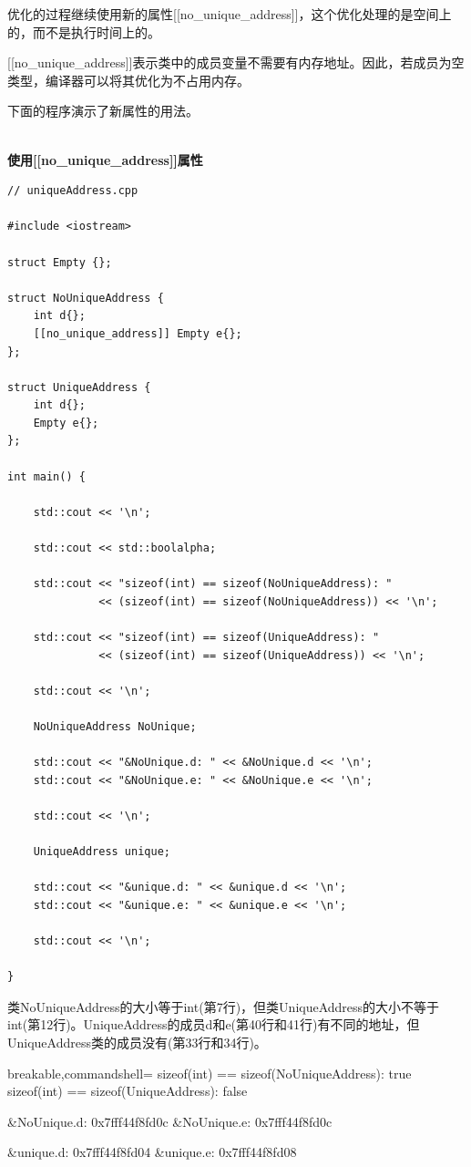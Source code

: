 优化的过程继续使用新的属性[[no\_unique\_address]]，这个优化处理的是空间上的，而不是执行时间上的。


[[no\_unique\_address]]表示类中的成员变量不需要有内存地址。因此，若成员为空类型，编译器可以将其优化为不占用内存。

下面的程序演示了新属性的用法。

\hspace*{\fill} \\ %
\noindent
\textbf{使用[[no\_unique\_address]]属性}
\begin{lstlisting}[style=styleCXX]
// uniqueAddress.cpp

#include <iostream>

struct Empty {};

struct NoUniqueAddress {
	int d{};
	[[no_unique_address]] Empty e{};
};

struct UniqueAddress {
	int d{};
	Empty e{};
};

int main() {

	std::cout << '\n';
	
	std::cout << std::boolalpha;
	
	std::cout << "sizeof(int) == sizeof(NoUniqueAddress): "
			  << (sizeof(int) == sizeof(NoUniqueAddress)) << '\n';
	
	std::cout << "sizeof(int) == sizeof(UniqueAddress): "
			  << (sizeof(int) == sizeof(UniqueAddress)) << '\n';
	
	std::cout << '\n';
	
	NoUniqueAddress NoUnique;
	
	std::cout << "&NoUnique.d: " << &NoUnique.d << '\n';
	std::cout << "&NoUnique.e: " << &NoUnique.e << '\n';
	
	std::cout << '\n';
	
	UniqueAddress unique;
	
	std::cout << "&unique.d: " << &unique.d << '\n';
	std::cout << "&unique.e: " << &unique.e << '\n';
	
	std::cout << '\n';

}
\end{lstlisting}

类NoUniqueAddress的大小等于int(第7行)，但类UniqueAddress的大小不等于int(第12行)。UniqueAddress的成员d和e(第40行和41行)有不同的地址，但UniqueAddress类的成员没有(第33行和34行)。

\begin{tcblisting}{breakable,commandshell={}}
sizeof(int) == sizeof(NoUniqueAddress): true
sizeof(int) == sizeof(UniqueAddress): false

&NoUnique.d: 0x7fff44f8fd0c
&NoUnique.e: 0x7fff44f8fd0c

&unique.d: 0x7fff44f8fd04
&unique.e: 0x7fff44f8fd08
\end{tcblisting}

